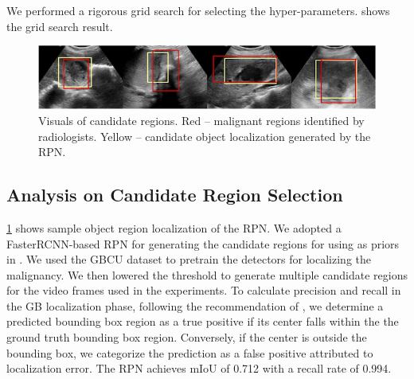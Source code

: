 %
We performed a rigorous grid search for selecting the hyper-parameters.  shows the grid search result.  

\begin{figure}[t]
    \centering
    \includegraphics[width=\linewidth]{figs/focusmae/roi_vis.png}
    \caption[Visuals of candidate region priors]{Visuals of candidate regions. Red -- malignant regions identified by radiologists. Yellow -- candidate object localization generated by the RPN.}
    \label{focusmae_fig:roi}
\end{figure}

\subsection{Analysis on Candidate Region Selection}
\cref{focusmae_fig:roi} shows sample object region localization of the RPN. We adopted a FasterRCNN-based RPN for generating the candidate regions for using as priors in \focusmae. We used the GBCU dataset to pretrain the detectors for localizing the malignancy. We then lowered the threshold to generate multiple candidate regions for the video frames used in the \focusmae experiments. To calculate precision and recall in the GB localization phase, following the recommendation of \cite{ribli2018detecting}, we determine a predicted bounding box region as a true positive if its center falls within the the ground truth bounding box region. Conversely, if the center is outside the bounding box, we categorize the prediction as a false positive attributed to localization error. The RPN achieves mIoU of 0.712 with a recall rate of 0.994.